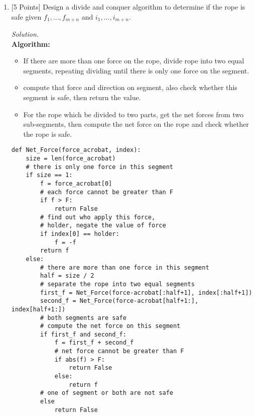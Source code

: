\documentclass[10pt]{article}
\begin{document}
\begin{enumerate}[label=(\alph*)]
    \item {[5 Points]} Design a divide and conquer algorithm to determine if the rope is safe given $f_1,...,f_{m+n}$ and $i_1,...,i_{m+n}$.
    \begin{mdframed}
        \textit{Solution.}\\
        \textbf{Algorithm:}
        \begin{itemize}
            \item If there are more than one force on the rope, divide rope into two equal segments, repeating dividing until there is only one force on the segment.
            \item compute that force and direction on segment, also check whether this segment is safe, then return the value.
            \item For the rope which be divided to two parts, get the net forces from two sub-segments, then compute the net force on the rope and check whether the rope is safe.
        \end{itemize}
        \lstset{language=Python}
    \begin{lstlisting}
def Net_Force(force_acrobat, index):
    size = len(force_acrobat)
    # there is only one force in this segment
    if size == 1:
        f = force_acrobat[0]
        # each force cannot be greater than F
        if f > F:
            return False
        # find out who apply this force,
        # holder, negate the value of force
        if index[0] == holder:
            f = -f
        return f
    else:
        # there are more than one force in this segment
        half = size / 2
        # separate the rope into two equal segments
        first_f = Net_Force(force-acrobat[:half+1], index[:half+1])
        second_f = Net_Force(force-acrobat[half+1:], index[half+1:])
        # both segments are safe
        # compute the net force on this segment
        if first_f and second_f:
            f = first_f + second_f
            # net force cannot be greater than F
            if abs(f) > F:
                return False
            else:
                return f
        # one of segment or both are not safe
        else
            return False
    \end{lstlisting}
        

\end{mdframed}
\end{enumerate}
\end{document}
